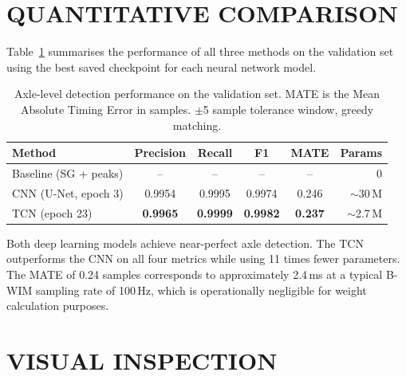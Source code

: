 
\section{QUANTITATIVE COMPARISON}

Table~\ref{tab:results} summarises the performance of all three methods on the
validation set using the best saved checkpoint for each neural network model.

\begin{table}[ht]
    \centering
    \caption{Axle-level detection performance on the validation set.
             MATE is the Mean Absolute Timing Error in samples.
             $\pm$5 sample tolerance window, greedy matching.}
    \label{tab:results}
    \begin{tabular}{lccccr}
        \toprule
        \textbf{Method} & \textbf{Precision} & \textbf{Recall}
                        & \textbf{F1} & \textbf{MATE} & \textbf{Params} \\
        \midrule
        Baseline (SG + peaks) & -- & -- & -- & -- & 0 \\
        CNN (U-Net, epoch 3)  & 0.9954 & 0.9995 & 0.9974 & 0.246 & $\sim$30\,M \\
        TCN (epoch 23)        & \textbf{0.9965} & \textbf{0.9999}
                              & \textbf{0.9982} & \textbf{0.237} & $\sim$2.7\,M \\
        \bottomrule
    \end{tabular}
\end{table}

Both deep learning models achieve near-perfect axle detection. The TCN
outperforms the CNN on all four metrics while using 11 times fewer parameters.
The MATE of 0.24 samples corresponds to approximately 2.4\,ms at a typical
B-WIM sampling rate of 100\,Hz, which is operationally negligible for weight
calculation purposes.

\section{VISUAL INSPECTION}

